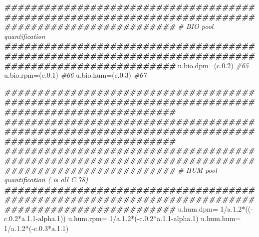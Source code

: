 \documentclass[
  10pt,
  b5paper,
]{book}
\newenvironment{Shaded}{\begin{snugshade}}{\end{snugshade}}
\newcommand{\CommentTok}[1]{\textcolor[rgb]{0.56,0.35,0.01}{\textit{#1}}}
\newcommand{\DecValTok}[1]{\textcolor[rgb]{0.00,0.00,0.81}{#1}}
\newcommand{\DocumentationTok}[1]{\textcolor[rgb]{0.56,0.35,0.01}{\textbf{\textit{#1}}}}
\newcommand{\FloatTok}[1]{\textcolor[rgb]{0.00,0.00,0.81}{#1}}
\newcommand{\NormalTok}[1]{#1}
\newcommand{\OtherTok}[1]{\textcolor[rgb]{0.56,0.35,0.01}{#1}}
\newcommand{\SpecialCharTok}[1]{\textcolor[rgb]{0.00,0.00,0.00}{#1}}
\begin{document}
\begin{Shaded}
\begin{Highlighting}[]
 \DocumentationTok{\#\#\#\#\#\#\#\#\#\#\#\#\#\#\#\#\#\#\#\#\#\#\#\#\#\#\#\#\#\#\#\#\#\#\#\#\#\#\#\#\#\#\#\#\#\#\#\#\#\#\#\#\#\#\#\#\#\#\#\#\#\#\#\#\#\#\#\#\#\#\#\#\#\#\#\#\#\#\#\#\#\#\#\#\#\#\#\#\#\#\#\#\#\#\#\#\#\#\#\#\#\#}
  \CommentTok{\# BIO pool quantification}
  \DocumentationTok{\#\#\#\#\#\#\#\#\#\#\#\#\#\#\#\#\#\#\#\#\#\#\#\#\#\#\#\#\#\#\#\#\#\#\#\#\#\#\#\#\#\#\#\#\#\#\#\#\#\#\#\#\#\#\#\#\#\#\#\#\#\#\#\#\#\#\#\#\#\#\#\#\#\#\#\#\#\#\#\#\#\#\#\#\#\#\#\#\#\#\#\#\#\#\#\#\#\#\#\#\#\#}
\NormalTok{  u.bio.dpm}\OtherTok{=}\NormalTok{(c.}\FloatTok{0.2}\NormalTok{) }\CommentTok{\#65}
\NormalTok{  u.bio.rpm}\OtherTok{=}\NormalTok{(c.}\FloatTok{0.1}\NormalTok{) }\CommentTok{\#66}
\NormalTok{  u.bio.hum}\OtherTok{=}\NormalTok{(c.}\FloatTok{0.3}\NormalTok{) }\CommentTok{\#67}
  
  \DocumentationTok{\#\#\#\#\#\#\#\#\#\#\#\#\#\#\#\#\#\#\#\#\#\#\#\#\#\#\#\#\#\#\#\#\#\#\#\#\#\#\#\#\#\#\#\#\#\#\#\#\#\#\#\#\#\#\#\#\#\#\#\#\#\#\#\#\#\#\#\#\#\#\#\#\#\#\#\#\#\#\#\#\#\#\#\#\#\#\#\#\#\#\#\#\#\#\#\#\#\#\#\#\#\#}
  \DocumentationTok{\#\#\#\#\#\#\#\#\#\#\#\#\#\#\#\#\#\#\#\#\#\#\#\#\#\#\#\#\#\#\#\#\#\#\#\#\#\#\#\#\#\#\#\#\#\#\#\#\#\#\#\#\#\#\#\#\#\#\#\#\#\#\#\#\#\#\#\#\#\#\#\#\#\#\#\#\#\#\#\#\#\#\#\#\#\#\#\#\#\#\#\#\#\#\#\#\#\#\#\#\#\#}
  \DocumentationTok{\#\#\#\#\#\#\#\#\#\#\#\#\#\#\#\#\#\#\#\#\#\#\#\#\#\#\#\#\#\#\#\#\#\#\#\#\#\#\#\#\#\#\#\#\#\#\#\#\#\#\#\#\#\#\#\#\#\#\#\#\#\#\#\#\#\#\#\#\#\#\#\#\#\#\#\#\#\#\#\#\#\#\#\#\#\#\#\#\#\#\#\#\#\#\#\#\#\#\#\#\#\#}
  \CommentTok{\# HUM pool quantification ( is all C.78)}
  \DocumentationTok{\#\#\#\#\#\#\#\#\#\#\#\#\#\#\#\#\#\#\#\#\#\#\#\#\#\#\#\#\#\#\#\#\#\#\#\#\#\#\#\#\#\#\#\#\#\#\#\#\#\#\#\#\#\#\#\#\#\#\#\#\#\#\#\#\#\#\#\#\#\#\#\#\#\#\#\#\#\#\#\#\#\#\#\#\#\#\#\#\#\#\#\#\#\#\#\#\#\#\#\#\#\#}
\NormalTok{  u.hum.dpm}\OtherTok{=} \DecValTok{1}\SpecialCharTok{/}\NormalTok{a.}\FloatTok{1.2}\SpecialCharTok{*}\NormalTok{((}\SpecialCharTok{{-}}\NormalTok{c.}\FloatTok{0.2}\SpecialCharTok{*}\NormalTok{a.}\FloatTok{1.1}\SpecialCharTok{{-}}\NormalTok{alpha}\FloatTok{.1}\NormalTok{))}
\NormalTok{  u.hum.rpm}\OtherTok{=} \DecValTok{1}\SpecialCharTok{/}\NormalTok{a.}\FloatTok{1.2}\SpecialCharTok{*}\NormalTok{(}\SpecialCharTok{{-}}\NormalTok{c.}\FloatTok{0.2}\SpecialCharTok{*}\NormalTok{a.}\FloatTok{1.1}\SpecialCharTok{{-}}\NormalTok{alpha}\FloatTok{.1}\NormalTok{)}
\NormalTok{  u.hum.hum}\OtherTok{=} \DecValTok{1}\SpecialCharTok{/}\NormalTok{a.}\FloatTok{1.2}\SpecialCharTok{*}\NormalTok{(}\SpecialCharTok{{-}}\NormalTok{c.}\FloatTok{0.3}\SpecialCharTok{*}\NormalTok{a.}\FloatTok{1.1}\NormalTok{)}
  

\end{Highlighting}
\end{Shaded}
\end{document}
